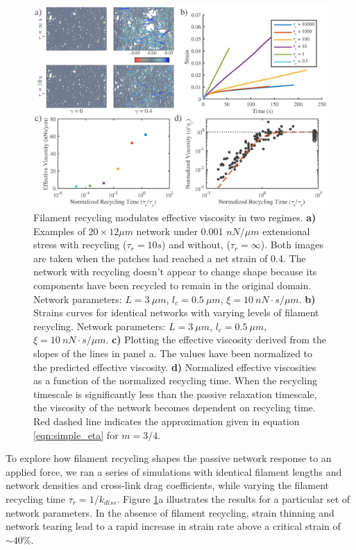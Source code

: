 \documentclass[10pt,letterpaper]{article}
\begin{document}
\begin{figure}[h!]
	\centering
	\includegraphics[width=\hsize]{figures/figure5a}
	\caption{\label{fig:passive_rec}  Filament recycling modulates effective viscosity in two regimes. \textbf{a)} Examples of $20 \times 12 \mu m$ network under 0.001 $nN/\mu m$ extensional stress with recycling ($\tau_r=10 s$) and without, ($\tau_r=\infty$).  Both images are taken when the patches had reached a net strain of 0.4.  The network with recycling doesn't appear to change shape because its components have been recycled to remain in the original domain.  Network parameters: $L=3\: \mu m$, $l_c=0.5\: \mu m$, $\xi=10\: nN\cdot s/\mu m$. \textbf{b)} Strains curves for identical networks with varying levels of filament recycling.  Network parameters: $L=3\: \mu m$, $l_c=0.5\: \mu m$, $\xi=10\: nN\cdot s/\mu m$. \textbf{c)}  Plotting the effective viscosity derived from the slopes of the lines in panel a. The values have been normalized to the predicted effective viscosity. \textbf{d)} Normalized effective viscosities as a function of the normalized recycling time. When the recycling timescale is significantly less than the passive relaxation timescale, the viscosity of the network becomes dependent on recycling time. Red dashed line indicates the approximation given in equation \ref{eqn:simple_eta} for $m=3/4$.}
\end{figure}

To explore how filament recycling shapes the passive network response to an applied force, we ran a series of simulations with identical filament lengths and network densities and cross-link drag coefficients, while varying the filament recycling time $\tau_r=1/k_{diss}$. Figure \ref{fig:passive_rec}a illustrates the results for a particular set of network parameters. In the absence of filament recycling, strain thinning and network tearing lead to a rapid increase in strain rate above a critical strain of $\sim40\%$. 
\end{document}
